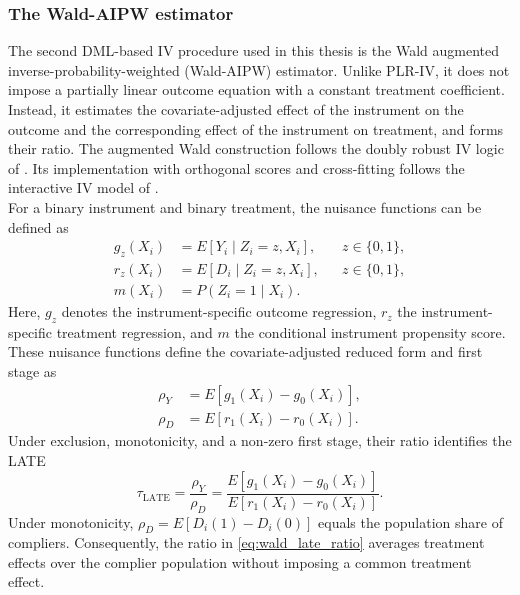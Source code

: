 \documentclass[12pt, a4paper, oneside]{article}
\theoremstyle{plain}
\theoremstyle{definition}
\begin{document}
\subsubsection{The Wald-AIPW estimator}

The second DML-based IV procedure used in this thesis is the Wald augmented
inverse-probability-weighted (Wald-AIPW) estimator. Unlike PLR-IV, it does not
impose a partially linear outcome equation with a constant treatment
coefficient. Instead, it estimates the covariate-adjusted effect of the
instrument on the outcome and the corresponding effect of the instrument on
treatment, and forms their ratio. 
 The augmented Wald
construction follows the doubly robust IV logic of \citet{tan2006regression}.
Its implementation
with orthogonal scores and cross-fitting follows the interactive IV model of
\citet[Section~5.2]{chernozhukov2018double}.\\
For a binary instrument and binary treatment, the nuisance functions can be defined as
\begin{align}
    g_z(X_i)&=E[Y_i\mid Z_i=z,X_i], &&z\in\{0,1\},
    \label{eq:wald_g_nuisance}\\
    r_z(X_i)&=E[D_i\mid Z_i=z,X_i], &&z\in\{0,1\},
    \label{eq:wald_r_nuisance}\\
    m(X_i)&=P(Z_i=1\mid X_i).
    \label{eq:wald_m_nuisance}
\end{align}
Here, $g_z$ denotes the instrument-specific outcome regression,
$r_z$  the instrument-specific treatment regression, and $m$ the
conditional instrument propensity score.
These nuisance functions define the covariate-adjusted reduced form and first
stage as
\begin{align}
    \rho_Y&=E[g_1(X_i)-g_0(X_i)],
    \label{eq:wald_reduced_form}\\
    \rho_D&=E[r_1(X_i)-r_0(X_i)].
    \label{eq:wald_first_stage}
\end{align}
Under exclusion, monotonicity, and a non-zero first stage, their ratio identifies the LATE
\begin{equation}
    \tau_{\mathrm{LATE}}=\frac{\rho_Y}{\rho_D}
    =\frac{E[g_1(X_i)-g_0(X_i)]}
           {E[r_1(X_i)-r_0(X_i)]}.
    \label{eq:wald_late_ratio}
\end{equation}
Under monotonicity, $\rho_D=E[D_i(1)-D_i(0)]$ equals the population share of
compliers. Consequently, the ratio in \eqref{eq:wald_late_ratio} averages treatment
effects over the complier population without imposing a common treatment
effect.\\
\end{document}
